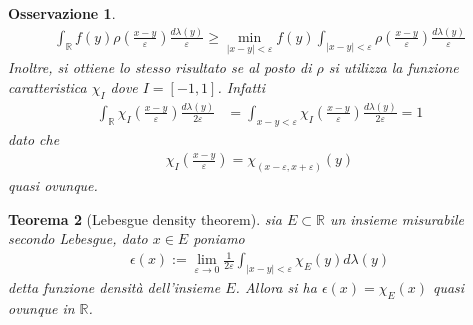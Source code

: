 \documentclass[oneside, 11pt]{amsbook}
\newcommand{\R}{\mathbb{R}}
\newcommand{\co}[1]{\textit{#1}}%
\newcommand{\0}{{(0)}}
\newcommand{\3}{{(3)}}
\newcommand{\e}{{\varepsilon}}
\theoremstyle{colonplain}
\newtheorem{thm}{Teorema}[chapter]
\theoremstyle{colondefinition}
\theoremstyle{colonremark}
\newtheorem{rmk}[thm]{Osservazione}
\numberwithin{equation}{chapter}
\begin{document}
\begin{rmk}
\begin{align}
        \int_\R f(y)\rho\left(\frac{x - y}{\e}\right)\frac{d\lambda(y)}{\e} \geq \min_{|x - y| < \e} f(y) \int_{|x - y| < \e} \rho\left(\frac{x - y}{\e}\right)\frac{d\lambda(y)}{\e}
    \end{align}
    Inoltre, si ottiene lo stesso risultato se al posto di $\rho$ si utilizza la funzione caratteristica $\chi_I$ dove $I = [-1, 1]$. Infatti
    \begin{align}
        \int_\R \chi_I\left(\frac{x - y}{\e}\right)\frac{d\lambda(y)}{2\e} &= \int_{x - y < \e} \chi_I\left(\frac{x - y}{\e}\right)\frac{d\lambda(y)}{2\e} = 1
    \end{align}
    dato che
    \begin{align}
        \chi_I\left(\frac{x - y}{\e}\right) = \chi_{(x - \e, x + \e)}(y)
    \end{align}
    quasi ovunque.
\end{rmk}
\begin{thm}[Lebesgue density theorem]\label{LebDensThm}
    sia $E \subset \R$ un insieme misurabile secondo Lebesgue, dato $x \in E$ poniamo
    \begin{align}
        \epsilon(x) := \lim_{\e \rightarrow 0} \frac{1}{2\e}\int_{|x - y| < \e} \chi_E(y)d\lambda(y)
    \end{align}
    detta \co{funzione densità dell'insieme} $E$. Allora si ha $\epsilon(x) = \chi_E(x)$ quasi ovunque in $\R$.
\end{thm}
\end{document}
